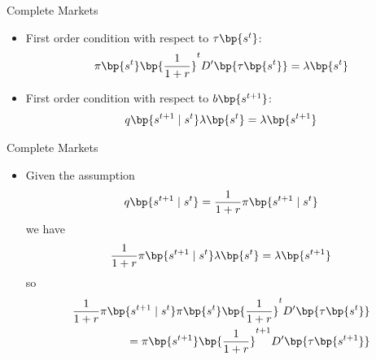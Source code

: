 \documentclass[11pt,xcolor={dvipsnames},hyperref={pdftex,pdfpagemode=UseNone,hidelinks,pdfdisplaydoctitle=true},usepdftitle=false]{beamer}
\begin{document}
        \begin{frame}{Complete Markets}
            \begin{itemize}
            \item First order condition with respect to $\tau \bp{s^t}$:
            \begin{align*}  
                \pi \bp{s^t} \bp{\frac{1}{1+r}}^t D' \bp{\tau \bp{s^t}} =  \lambda\bp{s^t}
            \end{align*}
            \item First order condition with respect to  $b \bp{s^{t+1}}$:
            \begin{align*}
                q\bp{s^{t+1}\mid s^t} \lambda\bp{s^t} = \lambda\bp{s^{t+1}} 
            \end{align*}
            \end{itemize}
            \end{frame}

            \begin{frame}{Complete Markets}
                \begin{itemize}
                \item Given the assumption              
                \begin{align*}
                    q\bp{s^{t+1}\mid s^t} = \frac{1}{1+r} \pi\bp{s^{t+1}\mid s^t} 
                \end{align*}
                we have 
                \begin{align*}  
                    \frac{1}{1+r} \pi\bp{s^{t+1}\mid s^t}  \lambda\bp{s^t} = \lambda\bp{s^{t+1}} 
                \end{align*}
                so 
                \begin{align*}
                    \frac{1}{1+r} \pi\bp{s^{t+1}\mid s^t} \pi \bp{s^t} \bp{\frac{1}{1+r}}^t D' \bp{\tau \bp{s^t}} \\ =   \pi \bp{s^{t+1}} \bp{\frac{1}{1+r}}^{t+1} D' \bp{\tau \bp{s^{t+1}}}
                \end{align*}
                \end{itemize}
                \end{frame}
\end{document}
